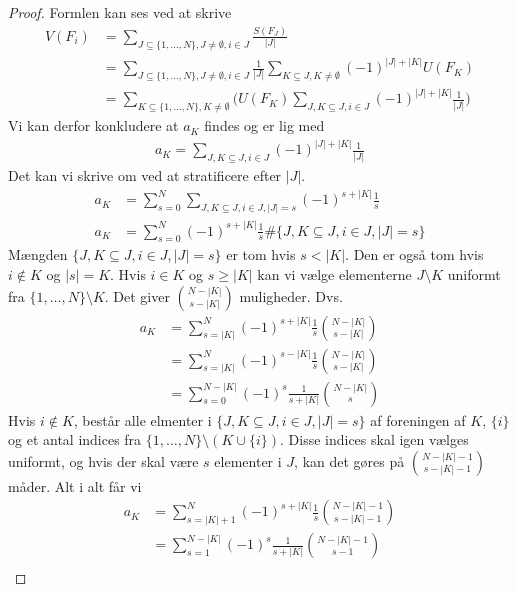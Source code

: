 \documentclass[a4paper, 12pt]{article}
\begin{document}
\begin{proof}
Formlen kan ses ved at skrive
\begin{align*}
V(F_i)&=\sum_{J\subseteq\{1,\dots, N\}, J\neq \emptyset, i\in J} \frac{S(F_J)}{|J|}\\
&=\sum_{J\subseteq\{1,\dots, N\}, J\neq \emptyset, i\in J}  \frac{1}{|J|}\sum_{K\subseteq J, K\neq \emptyset} (-1)^{|J|+|K|} U(F_K)\\
&=\sum_{K\subseteq \{1, \dots, N\}, K\neq \emptyset} \biggl( U(F_K)\sum_{J, K\subseteq J, i\in J} (-1)^{|J|+|K|} \frac{1}{|J|}\biggr)
\end{align*}
Vi kan derfor konkludere at $a_K$ findes og er lig med
\begin{align}
a_K=\sum_{J, K\subseteq J, i\in J} (-1)^{|J|+|K|} \frac{1}{|J|}
\end{align}
Det kan vi skrive om ved at stratificere efter $|J|$. 
\begin{align*}
a_K&=\sum_{s=0}^{N}\sum_{J, K\subseteq J, i\in J, |J|=s}(-1)^{s+|K|} \frac{1}{s}\\
a_K&=\sum_{s=0}^{N}(-1)^{s+|K|} \frac{1}{s}\#\bigl\{J, K\subseteq J, i\in J, |J|=s\bigr\}
\end{align*}
Mængden $\bigl\{J, K\subseteq J, i\in J, |J|=s\bigr\}$ er tom hvis $s<|K|$. Den er også tom hvis $i\not\in K$ og $|s|=K$. Hvis $i\in K$ og $s\geq |K|$ kan vi vælge elementerne $J\setminus K$ uniformt fra $\{1, \dots, N\}\setminus K$. Det giver ${N-|K| \choose s-|K|}$ muligheder. Dvs.
\begin{align*}
a_K&=\sum_{s=|K|}^{N}(-1)^{s+|K|} \frac{1}{s}{N-|K| \choose s-|K|}\\
&=\sum_{s=|K|}^{N}(-1)^{s-|K|} \frac{1}{s}{N-|K| \choose s-|K|}\\
&=\sum_{s=0}^{N-|K|}(-1)^{s} \frac{1}{s+|K|}{N-|K| \choose s}
\end{align*}
Hvis $i\not \in K$, består alle elmenter i $\bigl\{J, K\subseteq J, i\in J, |J|=s\bigr\}$ af foreningen af $K$, $\{i\}$ og et antal indices fra $\{1, \dots, N\} \setminus (K\cup \{i\})$. Disse indices skal igen vælges uniformt, og hvis der skal være $s$ elementer i $J$, kan det gøres på ${N-|K|-1 \choose s-|K|-1}$ måder. Alt i alt får vi
\begin{align*}
a_K&=\sum_{s=|K|+1}^{N}(-1)^{s+|K|}\frac{1}{s}{N-|K|-1 \choose s-|K|-1}\\
&=\sum_{s=1}^{N-|K|}(-1)^{s}\frac{1}{s+|K|}{N-|K|-1 \choose s-1}\\
\end{align*}
\end{proof}
\end{document}
